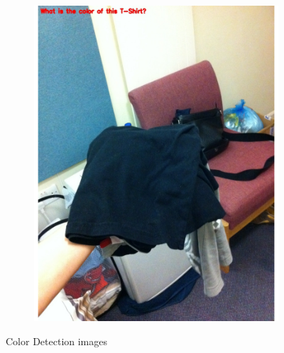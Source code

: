 \documentclass[sigconf]{acmart}
\begin{document}
\begin{figure}[hbp]
\begin{subfigure}[b]{0.3\columnwidth}
                \includegraphics[scale=0.3]{images/color_3.pdf}  
        \end{subfigure}%
        \caption{Color Detection images} 
        \label{fig:color}
\end{figure}
\end{document}

